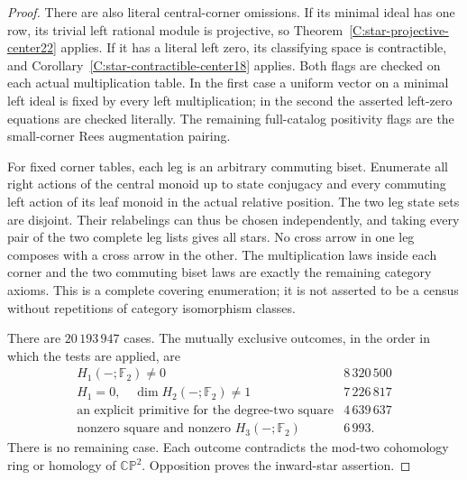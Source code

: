 \begin{proof}
There are also literal central-corner omissions. If its minimal
ideal has one row, its trivial left rational module is projective,
so Theorem~\ref{C:star-projective-center22} applies. If it has a
literal left zero, its classifying space is contractible, and
Corollary~\ref{C:star-contractible-center18} applies. Both flags
are checked on each actual multiplication table. In the first
case a uniform vector on a minimal left ideal is fixed by every
left multiplication; in the second the asserted left-zero
equations are checked literally. The remaining full-catalog
positivity flags are the small-corner Rees augmentation pairing.

For fixed corner tables, each leg is an arbitrary commuting
biset. Enumerate all right actions of the central monoid up to
state conjugacy and every commuting left action of its leaf
monoid in the actual relative position. The two leg state sets
are disjoint. Their relabelings can thus be chosen independently,
and taking every pair of the two complete leg lists gives all
stars. No cross arrow in one leg composes with a cross arrow
in the other. The multiplication laws inside each corner and
the two commuting biset laws are exactly the remaining category
axioms. This is a complete covering enumeration; it is not
asserted to be a census without repetitions of category
isomorphism classes.

There are $20\,193\,947$ cases. The mutually exclusive outcomes,
in the order in which the tests are applied, are
\[
\begin{array}{l|r}
 H_1(-;\mathbb F_2)\ne0&8\,320\,500\\
 H_1=0,\quad\dim H_2(-;\mathbb F_2)\ne1&7\,226\,817\\
 \text{an explicit primitive for the degree-two square}&4\,639\,637\\
 \text{nonzero square and nonzero }H_3(-;\mathbb F_2)&6\,993.
\end{array}
\]
There is no remaining case. Each outcome contradicts the
mod-two cohomology ring or homology of $\mathbb{CP}^2$.
Opposition proves the inward-star assertion.
\end{proof}

